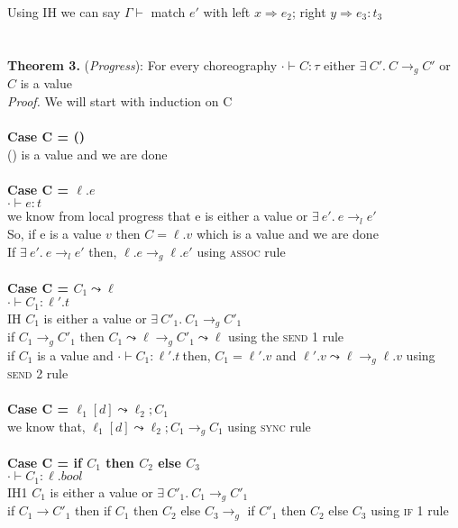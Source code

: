 \documentclass{article}
\begin{document}
Using IH we can say $\Gamma \vdash$ match $e'$ with left $x \Rightarrow e_2 $; right $ y \Rightarrow e_3 : t_3$ 
\\\\
\\
\textbf{Theorem 3.} (\textit{Progress}): For every choreography $\cdot \vdash C : \tau$ either $  \exists \ C'.\ C \to_g C'$  or $C$ is a value
  \\
\textit{Proof.} We will start with induction on C \\\\
\textbf{Case C = ()} \\
() is a value and we are done \\ \\
\textbf{Case C = $\ell.e$} \\
$\cdot \vdash e: t$\\
we know from local progress that e is either a value or $ \exists \ e'.\ e \to_l e'$  \\
So, if e is a value $v$ then $C = \ell.v$ which is a value and we are done \\
If $ \exists \ e'.\ e \to_l e'$ then, $ \ell. e \to_g \ell.e'$ using \textsc{assoc} rule
\\ \\
\textbf{Case C = $C_1 \leadsto \ell$} \\
$\cdot \vdash C_1: \ell'.t$\\
IH $C_1$ is either a value or $  \exists \ C'_1.\ C_1 \to_g C'_1 $ \\
if $C_1 \to_g C'_1$ then $C_1 \leadsto \ell \to_g C'_1 \leadsto \ell$ using the \textsc{send 1} rule \\
if $C_1$ is a value and $\cdot \vdash C_1: \ell'.t \ $then, $C_1 = \ell'.v$ and $\ell'.v \leadsto \ell \to_g \ell.v$ using \textsc{send 2} rule 
\\
\\
\textbf{Case C = $\ell_1[d] \leadsto \ell_2; C_1$} \\ 
 we know that, $\ell_1[d] \leadsto \ell_2; C_1 \to_g C_1$ using \textsc{sync} rule \\
\\
\textbf{Case C = if $C_1$ then $C_2$ else $C_3$} \\
$\cdot \vdash C_1: \ell.bool$\\
IH1 $C_1$ is either a value or $  \exists \ C'_1.\ C_1 \to_g C'_1 $ \\
if $C_1 \to C'_1$ then if $C_1$ then $C_2$ else $C_3 \to_g $ if $C'_1$ then $C_2$ else $C_3$ using \textsc{if 1} rule\\
\end{document}
